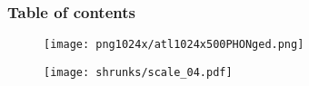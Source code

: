\date{\today} 

\begin{frame}
\titlepage
\end{frame}

\begin{frame}\frametitle{Table of contents}\tableofcontents
\end{frame} 


\begin{frame}
\begin{figure}
	\centering
	\texttt{[image: png1024x/atl1024x500PHONged.png]}
\end{figure}
\end{frame}

\begin{frame}
\begin{figure}
	\centering
	\texttt{[image: shrunks/scale\_04.pdf]}
\end{figure}
\end{frame}


